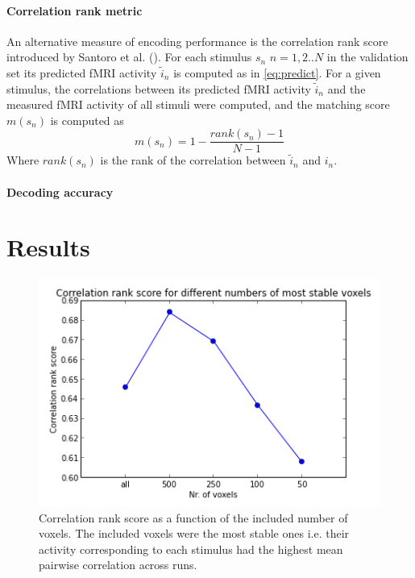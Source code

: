 \paragraph{Correlation rank metric}
An alternative measure of encoding performance is the correlation rank score introduced by Santoro et al. (\cite{SF14}). For each stimulus $s_{n}$ $n=1,2..N$  in the validation set its predicted f{MRI} activity $\widetilde{i}_{n}$ is computed as in \ref{eq:predict}.
For a given stimulus, the correlations between its predicted f{MRI} activity $\widetilde{i}_{n}$ and the measured f{MRI} activity of all stimuli were computed, and the matching score $m(s_{n})$ is computed as
\[ m(s_{n}) = 1-\frac{rank(s_{n})-1}{N-1} \]
Where $rank(s_{n})$ is the rank of the correlation between $\widetilde{i}_{n}$ and $i_{n}$.

\paragraph{Decoding accuracy}


\section*{Results}

	
\begin{figure}
	\centering
	\includegraphics[width=\linewidth]{pics/voxelnr}
	\caption{Correlation rank score as a function of the included number of voxels. The included voxels were the most stable ones i.e. their activity corresponding to each stimulus had the highest mean pairwise correlation across runs.}
	\label{fig:voxelnr}
\end{figure}
 
